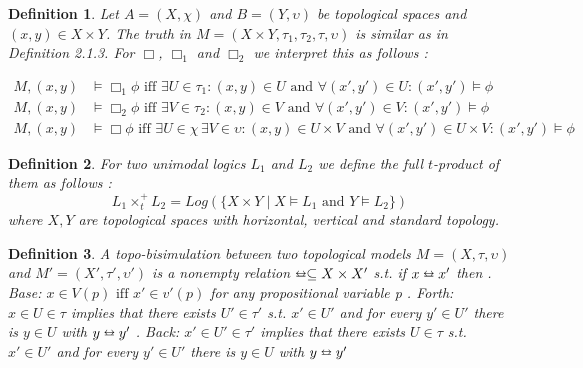 \documentclass[12pt, a4paper]{scrartcl}
\newtheorem{definition}{Definition}[subsection]
\begin{document}
\begin{definition}
    Let $A = (X, \chi)$ and $B =(Y, \upsilon)$ be topological spaces and $(x,y) \in X \times Y$. The truth in $M = (X\times Y, \tau_1,\tau_2,\tau, \upsilon)$ is similar as in Definition 2.1.3.
    For $\Box$, $\Box_1$ and $\Box_2$ we interpret this as follows : 
    
    \begin{align*}
        M,(x,y) &\vDash \Box_1 \phi \mbox{ iff } \exists U \in \tau_1 : (x,y) \in U \mbox{ and } \forall(x',y') \in U : (x',y') \vDash \phi \\
        M,(x,y) &\vDash \Box_2 \phi \mbox{ iff } \exists V \in \tau_2 : (x,y) \in V \mbox{ and } \forall(x',y') \in V : (x',y') \vDash \phi \\
        M,(x,y) &\vDash \Box \phi \mbox{ iff } \exists U \in \chi \, \exists V \in \upsilon: (x,y) \in U \times V \mbox{ and } \forall(x',y') \in U \times V : (x',y') \vDash \phi
    \end{align*}

\end{definition}

\begin{definition}
    For two unimodal logics $L_1$ and $L_2$ we define the full $t$-product of them as follows :
    $$L_1 \times^+_t L_2 = Log(\{X \times Y \mid X \vDash L_1 \mbox{ and } Y \vDash L_2\})$$
    where $X,Y$ are topological spaces with horizontal, vertical and standard topology.
\end{definition}

\begin{definition}
    A topo-bisimulation between two topological models $M = (X,\tau, \upsilon)$ and $M' = (X', \tau', \upsilon')$ is a nonempty relation $\leftrightarroweq \subseteq X \times X'$ s.t. if $x \leftrightarroweq x'$ then \newline 
    . Base: $x \in V(p) \mbox{ iff } x' \in v'(p)$ for any propositional variable p . Forth: $x \in U \in \tau$ implies that there exists $U' \in \tau'$ s.t. $x' \in U'$ and for every $y' \in U'$ there is $y \in U$ with $y \leftrightarroweq y'$ . Back: $x' \in U' \in \tau'$ implies that there exists $U \in \tau$ s.t. $x' \in U'$ and for every $y' \in U'$ there is $y \in U$ with $y \leftrightarroweq y'$

\end{definition}
\end{document}
